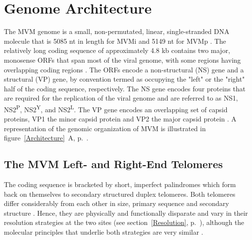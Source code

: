 
\chapter{Genome Architecture} %

\label{Chapter5} %





\label{sec: Architecture}
The MVM genome is a small, non-permutated, linear, single-stranded DNA molecule \cite{pmid789912, pmid225040, Genome1, Genome2} that is 5085 nt in length for MVMi and 5149 nt for MVMp \cite{pmid3502703}. The relatively long coding sequence of approximately 4.8 kb contains two major, monosense ORFs that span most of the viral genome, with some regions having overlapping coding regions \cite{pmid6298737}. The ORFs encode a non-structural (NS) gene and a structural (VP) gene, by convention termed as occupying the "left" or the "right" half of the coding sequence, respectively. The NS gene encodes four proteins that are required for the replication of the viral genome and are referred to as NS1, NS2\textsuperscript{P}, NS2\textsuperscript{Y}, and NS2\textsuperscript{L}. The VP gene encodes an overlapping set of capsid proteins, VP1 the minor capsid protein and VP2 the major capsid protein \cite{pmid6828378, pmid2939261, pmid2942705}. A representation of the genomic organization of MVM is illustrated in figure~\ref{Architecture}~A, p.~\pageref{Architecture}.   

\section{The MVM Left- and Right-End Telomeres}        

The coding sequence is bracketed by short, imperfect palindromes which form back on themselves to secondary structured duplex telomeres. Both telomeres differ considerably from each other in size, primary sequence and secondary structure \cite{pmid6298737}. Hence, they are physically and functionally disparate and vary in their resolution strategies at the two sites (see section~\ref{Resolution}, p.~\pageref{Resolution}), although the molecular principles that underlie both strategies are very similar \cite{encapsidation}. 

